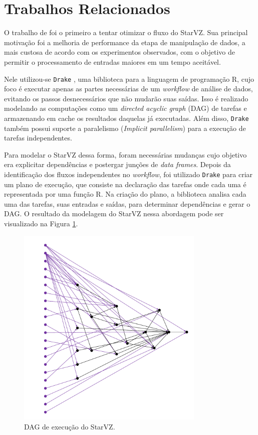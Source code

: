 \section{Trabalhos Relacionados}\label{sect:related-work}

O trabalho de \citet{ref:drakestarvz} foi o primeiro a tentar otimizar o fluxo 
do StarVZ. 
Sua principal motivação foi a melhoria de performance da etapa de manipulação 
de 
dados, a mais
custosa de acordo com os experimentos observados, com o objetivo de permitir o 
processamento de 
entradas maiores em um tempo aceitável.

Nele utilizou-se \texttt{Drake} \cite{ref:drake}, uma biblioteca para a 
linguagem de programação R, cujo foco é executar apenas as 
partes necessárias de um \emph{workflow} de análise de dados, evitando os 
passos 
desnecessários que não mudarão
suas saídas. Isso é realizado modelando as computações como um \emph{directed 
acyclic graph} (DAG) de tarefas e 
armazenando em cache os resultados daquelas já executadas. Além disso, 
\texttt{Drake} também possui suporte a paralelismo
(\emph{Implicit parallelism}) para a execução de tarefas independentes.

Para modelar o StarVZ dessa forma, foram necessárias mudanças cujo objetivo era 
explicitar 
dependências e postergar junções de \emph{data frames}. Depois da identificação 
dos fluxos independentes    
no \emph{workflow}, foi utilizado \texttt{Drake} para criar um plano de 
execução, que consiste na declaração
das tarefas onde cada uma é representada por uma função R. Na criação do plano, 
a biblioteca analisa cada
uma das tarefas, suas entradas e saídas, para determinar dependências e gerar o 
DAG. O resultado da modelagem do
StarVZ nessa abordagem pode ser visualizado na Figura \ref{fig:starvz-dag}.

\begin{figure}[ht]
\centerline{
\includegraphics[width=0.8\textwidth]{./img/drake-dag-final-origin.pdf}}
 \caption{DAG de execução do StarVZ.}
 \label{fig:starvz-dag}
\end{figure}

